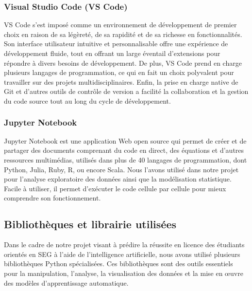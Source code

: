 \subsubsection{Visual Studio Code (VS Code)}
VS Code s'est imposé comme un environnement de développement de premier choix en raison de sa légèreté, de sa rapidité et de sa richesse en fonctionnalités. Son interface utilisateur intuitive et personnalisable offre une expérience de développement fluide, tout en offrant un large éventail d'extensions pour répondre à divers besoins de développement. De plus, VS Code prend en charge plusieurs langages de programmation, ce qui en fait un choix polyvalent pour travailler sur des projets multidisciplinaires. Enfin, la prise en charge native de Git et d'autres outils de contrôle de version a facilité la collaboration et la gestion du code source tout au long du cycle de développement.

\subsubsection{Jupyter Notebook}
Jupyter Notebook est une application Web open source qui permet de créer et de partager des documents comprenant du code en direct, des équations et d'autres ressources multimédias, utilisés dans plus de 40 langages de programmation, dont Python, Julia, Ruby, R, ou encore Scala. Nous l'avons utilisé dans notre projet pour l'analyse exploratoire des données ainsi que la modélisation statistique. Facile à utiliser, il permet d'exécuter le code cellule par cellule pour mieux comprendre son fonctionnement.

\subsection{Bibliothèques et librairie utilisées}
Dans le cadre de notre projet visant à prédire la réussite en licence des étudiants orientés en SEG à l'aide de l'intelligence artificielle, nous avons utilisé plusieurs bibliothèques Python spécialisées. Ces bibliothèques sont des outils essentiels pour la manipulation, l'analyse, la visualisation des données et la mise en œuvre des modèles d'apprentissage automatique. 

